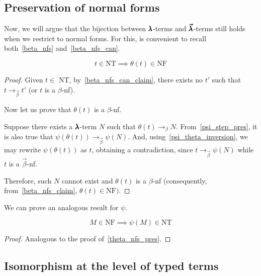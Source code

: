 
\subsection{Preservation of normal forms}

Now, we will argue that the bijection between $\pmb{\lambda}$-terms and $\pmb{\vec \lambda}$-terms still holds when we restrict to normal forms.
For this, is convenient to recall both~\cref{beta_nfs} and~\cref{beta_nfs_can}.

\begin{theorem}
  \label{theta_nfs_pres}
  \[ t \in \text{NT} \implies \theta(t) \in \text{NF} \]
\end{theorem}
\begin{proof}
  Given $t \in$ NT, by~\cref{beta_nfs_can_claim}, there exists no $t'$ such that $t \to_{\vec \beta} t'$ (or $t$ is a $\beta$-nf).

  Now let us prove that $\theta(t)$ is a $\beta$-nf.

  Suppose there exists a $\pmb{\lambda}$-term $N$ such that $\theta(t) \to_\beta N$.
  From~\cref{psi_step_pres}, it is also true that $\psi(\theta(t)) \to_{\vec \beta} \psi(N)$.
  And, using~\cref{psi_theta_inversion}, we may rewrite $\psi(\theta(t))$ as $t$, obtaining a contradiction, since $t \to_{\vec \beta} \psi(N)$ while $t$ is a $\vec \beta$-nf.

  Therefore, such $N$ cannot exist and $\theta(t)$ is a $\beta$-nf (consequently, from~\cref{beta_nfs_claim}, $\theta(t) \in \text{NF})$.
\end{proof}

We can prove an analogous result for $\psi$. 

\begin{theorem}
  \[ M \in \text{NF} \implies \psi(M) \in \text{NT} \]
\end{theorem}
\begin{proof}
  Analogous to the proof of~\cref{theta_nfs_pres}.
\end{proof}


\subsection{Isomorphism at the level of typed terms}

